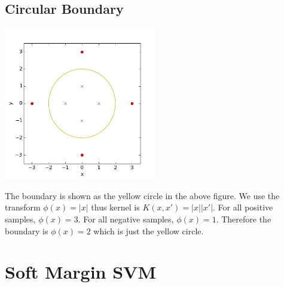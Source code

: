 \documentclass{article}
\begin{document}
\subsection{Circular Boundary}
\begin{center}
\includegraphics[width=0.5\textwidth]{../result/circular_boundary.jpg}
\end{center}
The boundary is shown as the yellow circle in the above figure. We use the transform $\phi(x)=|x|$ thus kernel is $K(x,x')=|x||x'|$. For all positive samples, $\phi(x)=3$. For all negative samples, $\phi(x)=1$. Therefore the boundary is $\phi(x)=2$ which is just the yellow circle.

\section{Soft Margin SVM}
\end{document}
